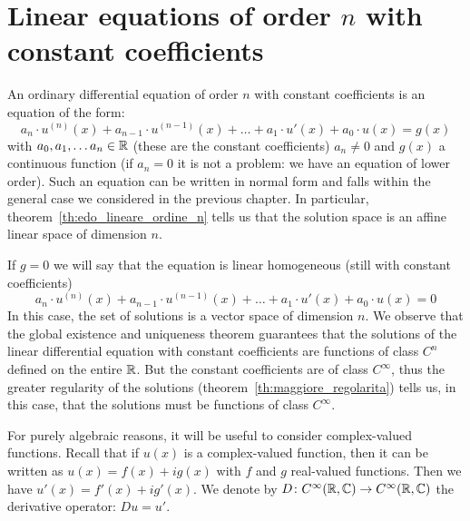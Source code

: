 \section{Linear equations of order $n$ with constant coefficients}

An ordinary differential equation of order $n$ with constant coefficients is an
equation of the form:
\mymark{***}
\begin{equation}\label{eq:edo_lineare_omogenea_coeff_costanti_non_omogenea}
    a_n\cdot u^{(n)}(x) + a_{n-1} \cdot u^{(n-1)}(x) + \dots + a_1 \cdot u'(x) +
  a_0 \cdot u(x) = g(x)
\end{equation}
with $a_0, a_1, \dots a_n \in {\mathbb R}$ (these are the constant coefficients)
$a_n\neq 0$ and $g(x)$ a continuous function
(if $a_n=0$ it is not a problem: we have an equation of lower order).
Such an equation can be written in normal form and falls within the general case
we considered in the previous chapter.
In particular, 
theorem~\ref{th:edo_lineare_ordine_n}
tells us that the solution space is an affine linear space of dimension $n$.

If $g=0$ we will say that the equation is linear homogeneous (still with
constant coefficients)
\begin{equation}\label{eq:edo_lineare_omogenea_coeff_costanti}
    a_n \cdot u^{(n)}(x) + a_{n-1} \cdot u^{(n-1)}(x) + \dots + a_1 \cdot u'(x)
  + a_0 \cdot u(x) = 0
\end{equation}
In this case, the set of solutions is a vector space of dimension $n$.
We observe that the global existence and uniqueness theorem guarantees that the
solutions
of the linear differential equation with constant coefficients are functions of 
class $C^n$ defined on the entire ${\mathbb R}$. 
But the constant coefficients are of class $C^\infty$, thus the greater
regularity of the solutions
(theorem~\ref{th:maggiore_regolarita}) 
tells us, in this case, that the solutions must be functions of class
$C^\infty$.

For purely algebraic reasons, it will be useful to consider complex-valued
functions.
Recall that if $u(x)$ is a complex-valued function,
then it can be written as $u(x) = f(x) + i g(x)$ with $f$ and $g$ real-valued
functions.
Then we have $u'(x) = f'(x) + ig'(x)$.
We denote by $D \colon C^\infty({\mathbb R}, {\mathbb C})\to C^\infty({\mathbb R}, {\mathbb C})$ the derivative
operator: $D u = u'$.


